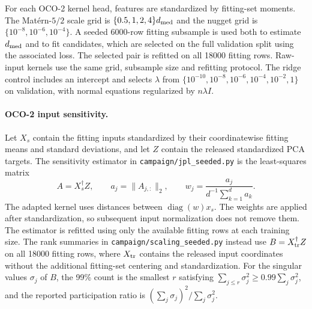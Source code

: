 For each OCO-2 kernel head, features are standardized by fitting-set
moments. The Mat\'ern-$5/2$ scale grid is
$\{0.5,1,2,4\}d_{\rm med}$ and the nugget grid is
$\{10^{-8},10^{-6},10^{-4}\}$. A seeded 6000-row fitting subsample is used
both to estimate $d_{\rm med}$ and to fit candidates, which are selected on
the full validation split using the associated loss. The selected pair is
refitted on all 18000 fitting rows. Raw-input kernels use the same grid,
subsample size and refitting protocol. The ridge control includes an
intercept and selects $\lambda$ from
$\{10^{-10},10^{-8},10^{-6},10^{-4},10^{-2},1\}$ on validation, with
normal equations regularized by $n\lambda I$.

\paragraph{OCO-2 input sensitivity.}\label{supp:oco-input}
Let $X_s$ contain the fitting inputs standardized by their coordinatewise
fitting means and standard deviations, and let $Z$ contain the released
standardized PCA targets. The sensitivity estimator in
\texttt{campaign/jpl\_seeded.py} is the least-squares matrix
\[
 A=X_s^{\dagger}Z,\qquad
 a_j=\|A_{j,:}\|_2,\qquad
 w_j=\frac{a_j}{d^{-1}\sum_{k=1}^{d}a_k}.
\]
The adapted kernel uses distances between $\operatorname{diag}(w)x_s$.
The weights are applied after standardization, so subsequent input
normalization does not remove them. The estimator is refitted using only
the available fitting rows at each training size. The rank summaries in
\texttt{campaign/scaling\_seeded.py} instead use
$B=X_{\rm tr}^{\dagger}Z$ on all 18000 fitting rows, where $X_{\rm tr}$
contains the released input coordinates without the additional fitting-set
centering and standardization. For the singular values $\sigma_j$ of $B$,
the 99\% count is the smallest $r$ satisfying
$\sum_{j\le r}\sigma_j^2\ge0.99\sum_j\sigma_j^2$, and the reported
participation ratio is $(\sum_j\sigma_j)^2/\sum_j\sigma_j^2$.

